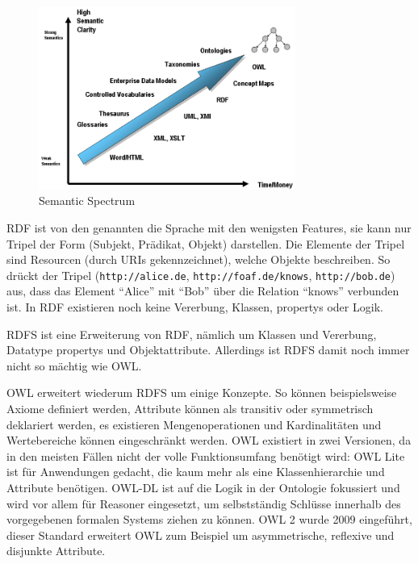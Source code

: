 \documentclass[
	headsepline,
	footsepline,
	fontsize=12pt,
	bibliography=totoc
]{scrbook}
\begin{document}
\begin{figure}[htbp]
	\centering
	\includegraphics[width=0.75\textwidth]{images/grundlagen-semantic_spectrum.png}
	\caption{Semantic Spectrum \cite{Bergman2007}}
	\label{figure:semantic_spectrum}
\end{figure}


RDF ist von den genannten die Sprache mit den wenigsten Features, sie kann nur Tripel der Form (Subjekt, Prädikat, Objekt) darstellen. Die Elemente der Tripel sind Resourcen (durch URIs gekennzeichnet), welche Objekte beschreiben. So drückt der Tripel (\texttt{http://alice.de}, \texttt{http://foaf.de/knows}, \texttt{http://bob.de}) aus, dass das Element \enquote{Alice} mit \enquote{Bob} über die Relation \enquote{knows} verbunden ist. In RDF existieren noch keine Vererbung, Klassen, propertys oder Logik.


RDFS ist eine Erweiterung von RDF, nämlich um Klassen und Vererbung, Datatype propertys und Objektattribute. Allerdings ist RDFS damit noch immer nicht so mächtig wie OWL.


OWL erweitert wiederum RDFS um einige Konzepte. So können beispielsweise Axiome definiert werden, Attribute können als transitiv oder symmetrisch deklariert werden, es existieren Mengenoperationen und Kardinalitäten und Wertebereiche können eingeschränkt werden. OWL existiert in zwei Versionen, da in den meisten Fällen nicht der volle Funktionsumfang benötigt wird: OWL Lite ist für Anwendungen gedacht, die kaum mehr als eine Klassenhierarchie und Attribute benötigen. OWL-DL ist auf die Logik in der Ontologie fokussiert und wird vor allem für Reasoner eingesetzt, um selbstständig Schlüsse innerhalb des vorgegebenen formalen Systems ziehen zu können. OWL 2 wurde 2009 eingeführt, dieser Standard erweitert OWL zum Beispiel um asymmetrische, reflexive und disjunkte Attribute.
\end{document}
